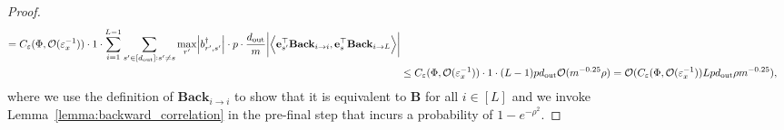 \begin{proof}
\begin{align*}
				= C_\varepsilon(\Phi, \mathcal{O}( \varepsilon_x^{-1})) \cdot 1 \cdot \sum_{i=1}^{L-1} \sum_{s' \in [d_{\mathrm{out}} ]: s' \ne s} \max_{r'}   \abs{b_{r', s'}^{\dagger}} \cdot p \cdot  \frac{d_{\mathrm{out}} }{m} \abs{\left\langle \mathbf{e}_{s'}^{\top} \mathbf{Back}_{i \to i},  \mathbf{e}_{s}^{\top} \mathbf{Back}_{i \to L} \right\rangle} \\&
				\le C_\varepsilon(\Phi, \mathcal{O}( \varepsilon_x^{-1})) \cdot 1 \cdot (L-1) p d_{\mathrm{out}}  \mathcal{O}(m^{-0.25} \rho) = \mathcal{O}(C_\varepsilon(\Phi, \mathcal{O}( \varepsilon_x^{-1})) L p d_{\mathrm{out}} \rho m^{-0.25}),
			\end{align*}
			\endgroup
			where we use the definition of $\mathbf{Back}_{i \to i}$ to show that it is equivalent to $\mathbf{B}$ for all $i \in [L]$ and we invoke Lemma~\ref{lemma:backward_correlation} in the pre-final step that incurs a probability of $1 - e^{-\rho^2}$.
			

\end{proof}
